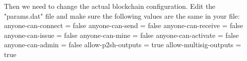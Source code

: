 \documentclass[11pt]{article}
\begin{document}
	Then we need to change the actual blockchain configuration. Edit the "params.dat" file and make sure the following values are the same in your file:\newline\newline
	anyone-can-connect = false\newline
	anyone-can-send = false\newline
	anyone-can-receive = false\newline
	anyone-can-issue = false\newline
	anyone-can-mine = false\newline
	anyone-can-activate = false\newline
	anyone-can-admin = false\newline
	allow-p2sh-outputs = true\newline
	allow-multisig-outputs = true\newline
	\newline
	
\end{document}
